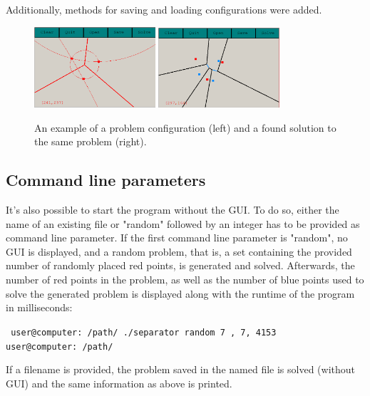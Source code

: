 \documentclass[a4paper,12pt]{article}
\begin{document}
Additionally, methods for saving and loading configurations were added.

\begin{figure}[h]
\includegraphics[width=0.4\textwidth]{pictures/gui.png}
\includegraphics[width=0.4\textwidth]{pictures/guisolved.png}
 \caption[Close up of \textit{Hemidactylus} sp.]
   {An example of a problem configuration (left) and a found solution to the same problem (right).}
\end{figure}


\subsection{Command line parameters}

It's also possible to start the program without the GUI. To do so, either the name of an existing file or "random" followed by an integer has to be provided as command line parameter. If the first command line parameter is "random", no GUI is displayed, and a random problem, that is, a set containing the provided number of randomly placed red points, is generated and solved. Afterwards, the number of red points in the problem, as well as the number of blue points used to solve the generated problem is displayed along with the runtime of the program in milliseconds:

\texttt{ \newline
user@computer:~/path/\textdollar{} ./separator random 7 , 7, 4153 \newline
user@computer:~/path/\textdollar{}
}


If a filename is provided, the problem saved in the named file is solved (without GUI) and the same information as above is printed.
\end{document}

